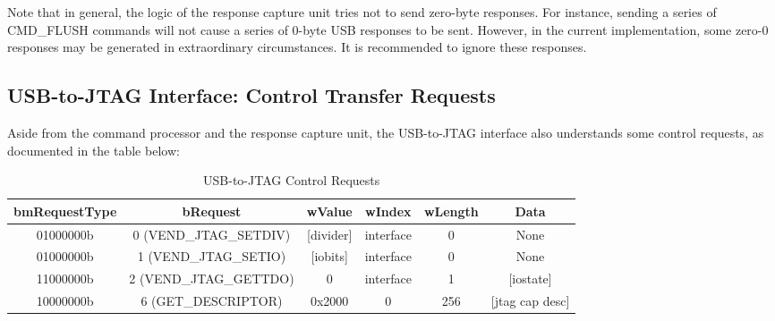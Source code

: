 \documentclass[main\_\_EN.tex]{subfiles}
\begin{document}
Note that in general, the logic of the response capture unit tries not to send zero-byte responses. For instance, sending a series of CMD\_FLUSH commands will not cause a series of 0-byte USB responses to be sent. However, in the current implementation, some zero-0 responses may be generated in extraordinary circumstances. It is recommended to ignore these responses.

\subsection{USB-to-JTAG Interface: Control Transfer Requests}

Aside from the command processor and the response capture unit, the USB-to-JTAG interface also understands some control requests, as documented in the table below:

\begin{table}[H]
\centering
\caption{USB-to-JTAG Control Requests}
\label{tab:usbserialjtag-control-requests}

\begin{tabular}{|c|c|c|c|c|c|}\hline
\rowcolor{lightgray}
\textbf{bmRequestType} & \textbf{bRequest} & \textbf{wValue} & \textbf{wIndex} & \textbf{wLength} & \textbf{Data} \\\hline

01000000b &  0 (VEND\_JTAG\_SETDIV) & [divider] & interface & 0 &  None \\\hline
01000000b &  1 (VEND\_JTAG\_SETIO) &  [iobits] &  interface & 0 &   None \\\hline
11000000b &  2 (VEND\_JTAG\_GETTDO) & 0 & interface & 1 & [iostate] \\\hline
10000000b &  6 (GET\_DESCRIPTOR) &   0x2000 &  0 &  256 & [jtag cap desc] \\\hline
\end{tabular}
\end{table}
\end{document}
